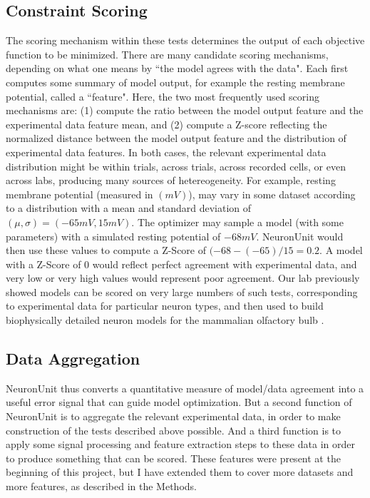 \subsection{Constraint Scoring}
The scoring mechanism within these tests determines the output of each objective function to be minimized.  There are many candidate scoring mechanisms, depending on what one means by ``the model agrees with the data".  Each first computes some summary of model output, for example the resting membrane potential, called a ``feature".
Here, the two most frequently used scoring mechanisms are: (1) compute the ratio between the model output feature and the experimental data feature mean, and (2) compute a Z-score reflecting the normalized distance between the model output feature and the distribution of experimental data features.
In both cases, the relevant experimental data distribution might be within trials, across trials, across recorded cells, or even across labs, producing many sources of hetereogeneity.
For example, resting membrane potential (measured in $(mV)$), may vary in some dataset according to a distribution with a mean and standard deviation of $(\mu,\sigma)=(-65mV,15mV)$.
The optimizer may sample a model (with some parameters) with a simulated resting potential of $-68mV$.  
NeuronUnit would then use these values to compute a Z-Score of $(-68 - (-65)/15 = 0.2$.
A model with a Z-Score of 0 would reflect perfect agreement with experimental data, and very low or very high values would represent poor agreement.
Our lab previously showed models can be scored on very large numbers of such tests, corresponding to experimental data for particular neuron types, and then used to build biophysically detailed neuron models for the mammalian olfactory bulb \citep{birgiolas2019towards}.

\subsection{Data Aggregation}
NeuronUnit thus converts a quantitative measure of model/data agreement into a useful error signal that can guide model optimization.
But a second function of NeuronUnit is to aggregate the relevant experimental data, in order to make  construction of the tests described above possible.
And a third function is to apply some signal processing and feature extraction steps to these data in order to produce something that can be scored.
These features were present at the beginning of this project, but I have extended them to cover more datasets and more features, as described in the Methods.

